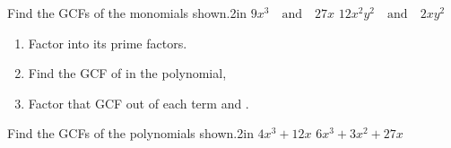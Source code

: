 \documentclass[letterpaper,12pt]{memoir}
\begin{document}

\begin{myProblems2}{Find the GCFs of the monomials shown.}{2in}
    {\( 9x^3 \quad\text{and}\quad 27x \)}
    {\( 12x^2y^2 \quad\text{and}\quad 2xy^2 \)}
\end{myProblems2}

\begin{myKeyConcepts}
    \begin{enumerate}
        \item Factor  into its prime factors.
        \item Find the GCF of  in the polynomial, 
        \item Factor that GCF out of each term and .
    \end{enumerate}
\end{myKeyConcepts}


\begin{myProblems2}{Find the GCFs of the polynomials shown.}{2in}
    {\( 4x^3 + 12x \)}
    {\( 6x^3 + 3x^2 + 27x \)}
\end{myProblems2}
\end{document}
